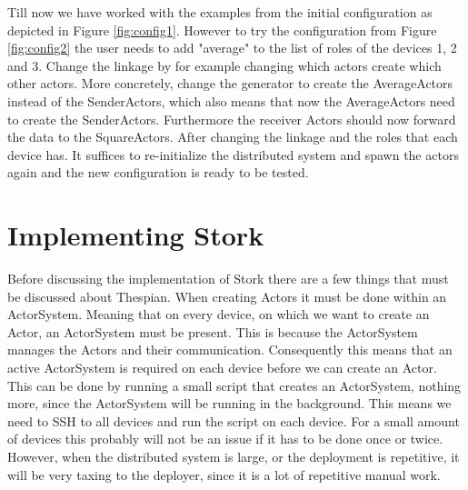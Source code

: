 \documentclass[a4paper]{article}
\begin{document}
Till now we have worked with the examples from the initial configuration as depicted in Figure \ref{fig:config1}. However to try the configuration from Figure \ref{fig:config2} the user needs to add "average" to the list of roles of the devices 1, 2 and 3. Change the linkage by for example changing which actors create which other actors. More concretely, change the generator to create the AverageActors instead of the SenderActors, which also means that now the AverageActors need to create the SenderActors. Furthermore the receiver Actors should now forward the data to the SquareActors. After changing the linkage and the roles that each device has. It suffices to re-initialize the distributed system and spawn the actors again and the new configuration is ready to be tested.

\section{Implementing Stork}
Before discussing the implementation of Stork there are a few things that must be discussed about Thespian. When creating Actors it must be done within an ActorSystem. Meaning that on every device, on which we want to create an Actor, an ActorSystem must be present. This is because the ActorSystem manages the Actors and their communication. Consequently this means that an active ActorSystem is required on each device before we can create an Actor. This can be done by running a small script that creates an ActorSystem, nothing more, since the ActorSystem will be running in the background. This means we need to SSH to all devices and run the script on each device. For a small amount of devices this probably will not be an issue if it has to be done once or twice. However, when the distributed system is large, or the deployment is repetitive, it will be very taxing to the deployer, since it is a lot of repetitive manual work.
\end{document}
